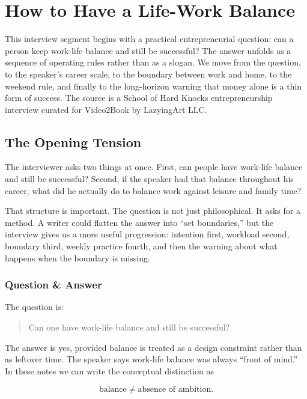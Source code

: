 \chapter{How to Have a Life-Work Balance}

This interview segment begins with a practical entrepreneurial question: can a person keep work-life balance and still be successful? The answer unfolds as a sequence of operating rules rather than as a slogan. We move from the question, to the speaker's career scale, to the boundary between work and home, to the weekend rule, and finally to the long-horizon warning that money alone is a thin form of success. The source is a School of Hard Knocks entrepreneurship interview curated for Video2Book by LazyingArt LLC.

\section{The Opening Tension}

The interviewer asks two things at once. First, can people have work-life balance and still be successful? Second, if the speaker had that balance throughout his career, what did he actually do to balance work against leisure and family time?

That structure is important. The question is not just philosophical. It asks for a method. A writer could flatten the answer into ``set boundaries,'' but the interview gives us a more useful progression: intention first, workload second, boundary third, weekly practice fourth, and then the warning about what happens when the boundary is missing.

\subsection{Question \& Answer}

The question is:

\begin{quote}
Can one have work-life balance and still be successful?
\end{quote}

The answer is yes, provided balance is treated as a design constraint rather than as leftover time. The speaker says work-life balance was always ``front of mind.'' In these notes we can write the conceptual distinction as

\begin{equation}
\text{balance}
\neq
\text{absence of ambition}.
\end{equation}

